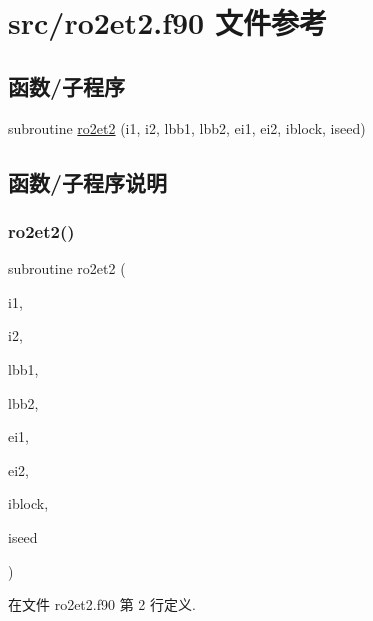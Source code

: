 \hypertarget{ro2et2_8f90}{}\section{src/ro2et2.f90 文件参考}
\label{ro2et2_8f90}
\subsection*{函数/子程序}
\begin{DoxyCompactItemize}
\item 
subroutine \mbox{\hyperlink{ro2et2_8f90_a2ebcecaf60a9ff8cb2ca2db6893212fd}{ro2et2}} (i1, i2, lbb1, lbb2, ei1, ei2, iblock, iseed)
\end{DoxyCompactItemize}


\subsection{函数/子程序说明}
\mbox{\label{ro2et2_8f90_a2ebcecaf60a9ff8cb2ca2db6893212fd}} 
\subsubsection{\texorpdfstring{ro2et2()}{ro2et2()}}
{\footnotesize\ttfamily subroutine ro2et2 (\begin{DoxyParamCaption}\item[{}]{i1,  }\item[{}]{i2,  }\item[{}]{lbb1,  }\item[{}]{lbb2,  }\item[{}]{ei1,  }\item[{}]{ei2,  }\item[{}]{iblock,  }\item[{}]{iseed }\end{DoxyParamCaption})}



在文件 ro2et2.\+f90 第 2 行定义.

